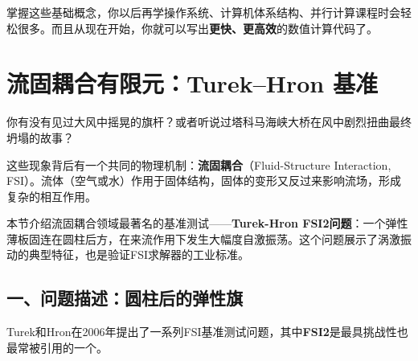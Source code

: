 掌握这些基础概念，你以后再学操作系统、计算机体系结构、并行计算课程时会轻松很多。而且从现在开始，你就可以写出\textbf{更快、更高效}的数值计算代码了。


\section*{流固耦合有限元：Turek--Hron 基准}

\begin{tcolorbox}[colback=gray!5, colframe=gray!50, title=本节导读]
你有没有见过大风中摇晃的旗杆？或者听说过塔科马海峡大桥在风中剧烈扭曲最终坍塌的故事？

这些现象背后有一个共同的物理机制：\textbf{流固耦合}（Fluid-Structure Interaction, FSI）。流体（空气或水）作用于固体结构，固体的变形又反过来影响流场，形成复杂的相互作用。

本节介绍流固耦合领域最著名的基准测试——\textbf{Turek-Hron FSI2问题}：一个弹性薄板固连在圆柱后方，在来流作用下发生大幅度自激振荡。这个问题展示了涡激振动的典型特征，也是验证FSI求解器的工业标准。
\end{tcolorbox}

\subsection*{一、问题描述：圆柱后的弹性旗}

Turek和Hron在2006年提出了一系列FSI基准测试问题，其中\textbf{FSI2}是最具挑战性也最常被引用的一个。

